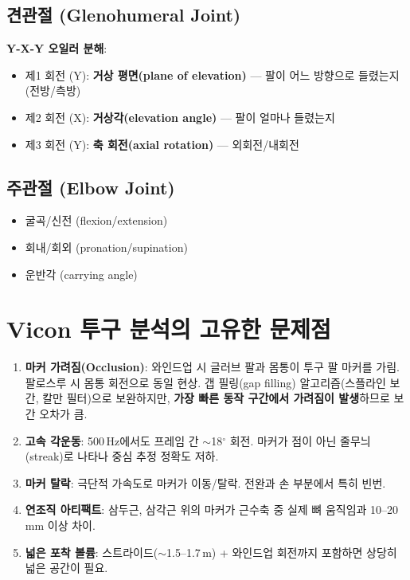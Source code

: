 \documentclass[11pt, a4paper]{report}
\begin{document}
\subsection{견관절 (Glenohumeral Joint)}

\textbf{Y-X-Y 오일러 분해}:
\begin{itemize}[leftmargin=*]
  \item 제1 회전 (Y): \textbf{거상 평면(plane of elevation)} --- 팔이 어느 방향으로 들렸는지 (전방/측방)
  \item 제2 회전 (X): \textbf{거상각(elevation angle)} --- 팔이 얼마나 들렸는지
  \item 제3 회전 (Y): \textbf{축 회전(axial rotation)} --- 외회전/내회전
\end{itemize}

\subsection{주관절 (Elbow Joint)}

\begin{itemize}[leftmargin=*]
  \item 굴곡/신전 (flexion/extension)
  \item 회내/회외 (pronation/supination)
  \item 운반각 (carrying angle)
\end{itemize}


\section{Vicon 투구 분석의 고유한 문제점}
\label{sec:vicon_challenges}

\begin{enumerate}[leftmargin=*]
  \item \textbf{마커 가려짐(Occlusion)}: 와인드업 시 글러브 팔과 몸통이 투구 팔 마커를 가림. 팔로스루 시 몸통 회전으로 동일 현상. 갭 필링(gap filling) 알고리즘(스플라인 보간, 칼만 필터)으로 보완하지만, \textbf{가장 빠른 동작 구간에서 가려짐이 발생}하므로 보간 오차가 큼.

  \item \textbf{고속 각운동}: 500\,Hz에서도 프레임 간 $\sim$18$^\circ$ 회전. 마커가 점이 아닌 줄무늬(streak)로 나타나 중심 추정 정확도 저하.

  \item \textbf{마커 탈락}: 극단적 가속도로 마커가 이동/탈락. 전완과 손 부분에서 특히 빈번.

  \item \textbf{연조직 아티팩트}: 삼두근, 삼각근 위의 마커가 근수축 중 실제 뼈 움직임과 10--20\,mm 이상 차이.

  \item \textbf{넓은 포착 볼륨}: 스트라이드($\sim$1.5--1.7\,m) + 와인드업 회전까지 포함하면 상당히 넓은 공간이 필요.
\end{enumerate}
\end{document}
